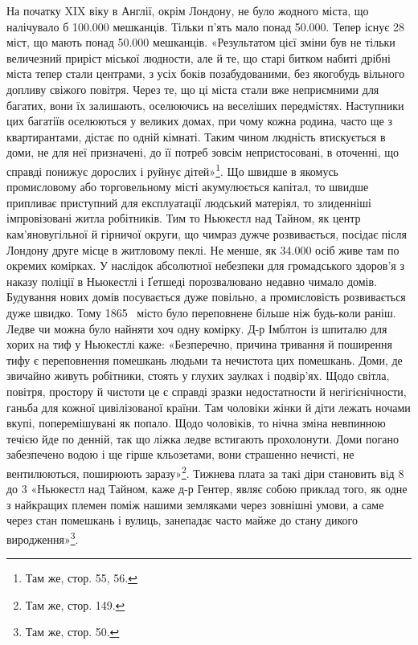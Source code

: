 На початку XIX віку в Англії, окрім Лондону, не було жодного
міста, що налічувало б \num{100.000} мешканців. Тільки п’ять
мало понад \num{50.000}. Тепер існує 28 міст, що мають понад \num{50.000} мешканців.
«Результатом цієї зміни був не тільки величезний приріст
міської людности, але й те, що старі битком набиті дрібні
міста тепер стали центрами, з усіх боків позабудованими, без
якогобудь вільного допливу свіжого повітря. Через те, що ці
міста стали вже неприємними для багатих, вони їх залишають,
оселюючись на веселіших передмістях. Наступники цих багатіїв
оселюються у великих домах, при чому кожна родина, часто ще
з квартирантами, дістає по одній кімнаті. Таким чином людність
втискується в доми, не для неї призначені, до її потреб зовсім
непристосовані, в оточенні, що справді понижує дорослих і руйнує
дітей»\footnote{
Там же, стор. 55, 56.
}. Що швидше в якомусь промисловому або торговельному
місті акумулюється капітал, то швидше припливає
приступний для експлуатації людський матеріял, то злиденніші
імпровізовані житла робітників. Тим то Ньюкестл над Тайном,
як центр кам’яновугільної й гірничої округи, що чимраз дужче
розвивається, посідає після Лондону друге місце в житловому
пеклі. Не менше, як \num{34.000} осіб живе там по окремих комірках.
У наслідок абсолютної небезпеки для громадського здоров’я
з наказу поліції в Ньюкестлі і Ґетшеді порозвалювано недавно
чимало домів. Будування нових домів посувається дуже повільно,
а промисловість розвивається дуже швидко. Тому 1865~
місто було переповнене більше ніж будь-коли раніш. Ледве
чи можна було найняти хоч одну комірку. Д-р Імблтон із шпиталю
для хорих на тиф у Ньюкестлі каже: «Безперечно, причина
тривання й поширення тифу є переповнення помешкань людьми
та нечистота цих помешкань. Доми, де звичайно живуть робітники,
стоять у глухих заулках і подвір’ях. Щодо світла, повітря,
простору й чистоти це є справді зразки недостатности й негігієнічности,
ганьба для кожної цивілізованої країни. Там чоловіки
жінки й діти лежать ночами вкупі, поперемішувані як попало.
Щодо чоловіків, то нічна зміна невпинною течією йде по
денній, так що ліжка ледве встигають прохолонути. Доми погано
забезпечено водою і ще гірше кльозетами, вони страшенно нечисті,
не вентилюються, поширюють заразу»\footnote{
Там же, стор. 149.
}. Тижнева плата
за такі діри становить від 8 до 3 «Ньюкестл
над Тайном, каже д-р Гентер, являє собою приклад того, як
одне з найкращих племен поміж нашими земляками через зовнішні
умови, а саме через стан помешкань і вулиць, занепадає
часто майже до стану дикого виродження»\footnote{
Там же, стор. 50.
}.

